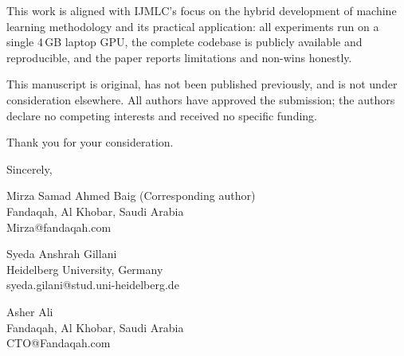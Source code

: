 \documentclass[11pt]{article}
\begin{document}
This work is aligned with IJMLC's focus on the hybrid development of machine
learning methodology and its practical application: all experiments run on a
single 4\,GB laptop GPU, the complete codebase is publicly available and
reproducible, and the paper reports limitations and non-wins honestly.

This manuscript is original, has not been published previously, and is not under
consideration elsewhere. All authors have approved the submission; the authors
declare no competing interests and received no specific funding.

Thank you for your consideration.

\vspace{6pt}
Sincerely,

\vspace{6pt}
Mirza Samad Ahmed Baig (Corresponding author) \\
Fandaqah, Al Khobar, Saudi Arabia \\
Mirza@fandaqah.com

\vspace{4pt}
Syeda Anshrah Gillani \\
Heidelberg University, Germany \\
syeda.gilani@stud.uni-heidelberg.de

\vspace{4pt}
Asher Ali \\
Fandaqah, Al Khobar, Saudi Arabia \\
CTO@Fandaqah.com
\end{document}
